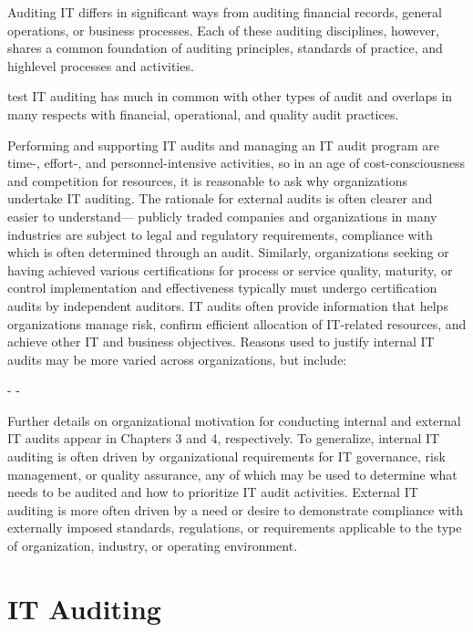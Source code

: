 Auditing IT differs in significant ways from auditing financial records, general operations, or business processes. Each of these auditing disciplines, however,
shares a common foundation of auditing principles, standards of practice, and highlevel processes and activities.

 {test}
IT auditing has much in common with other types of audit and overlaps in many respects with financial, operational, and quality audit practices.


Performing and supporting IT audits and managing an IT audit program are time-,
effort-, and personnel-intensive activities, so in an age of cost-consciousness and
competition for resources, it is reasonable to ask why organizations undertake IT
auditing. The rationale for external audits is often clearer and easier to understand—
publicly traded companies and organizations in many industries are subject to legal
and regulatory requirements, compliance with which is often determined through an
audit. Similarly, organizations seeking or having achieved various certifications for
process or service quality, maturity, or control implementation and effectiveness typically must undergo certification audits by independent auditors. IT audits often provide information that helps organizations manage risk, confirm efficient allocation of
IT-related resources, and achieve other IT and business objectives. Reasons used to
justify internal IT audits may be more varied across organizations, but include:

- 
- 

Further details on organizational motivation for conducting internal and external IT audits appear in Chapters  3 and 4, respectively. To generalize, internal IT
auditing is often driven by organizational requirements for IT governance, risk
management, or quality assurance, any of which may be used to determine what
needs to be audited and how to prioritize IT audit activities. External IT auditing
is more often driven by a need or desire to demonstrate compliance with externally
imposed standards, regulations, or requirements applicable to the type of organization, industry, or operating environment.

\section{IT Auditing}

